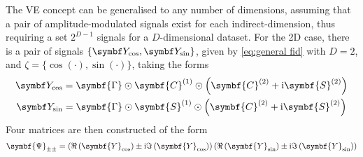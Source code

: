 The \ac{VE} concept can be generalised to any number of dimensions, assuming
that a pair of amplitude-modulated signals exist for each indirect-dimension,
thus requiring a set $2^{D-1}$ signals for a $D$-dimensional dataset. For the
\ac{2D} case, there is a pair of signals $\lbrace \bY_{\cos}, \bY_{\sin}
\rbrace$, given by \eqref{eq:general fid} with $D=2$, and $\zeta = \lbrace
\cos(\cdot), \sin(\cdot) \rbrace$, taking the forms
\begin{subequations}
    \begin{gather}
        \bY_{\cos} =
            \symbf{\Gamma} \odot
            \symbf{C}^{(1)} \odot \left(
                \symbf{C}^{(2)} +
                \iu \symbf{S}^{(2)}
            \right) \\
        \bY_{\sin} =
            \symbf{\Gamma} \odot
            \symbf{S}^{(1)} \odot \left(
                \symbf{C}^{(2)} +
                \iu \symbf{S}^{(2)}
            \right)
    \end{gather}
\end{subequations}
Four matrices are then constructed of the form
\begin{equation}
    \symbf{\Psi}_{\pm\pm} =
        \left(
            \Re\left( \symbf{Y}_{\cos} \right) \pm
            \iu \Im\left( \symbf{Y}_{\cos} \right)
        \right)
        \left(
            \Re\left( \symbf{Y}_{\sin} \right) \pm
            \iu \Im\left( \symbf{Y}_{\sin} \right)
        \right)
\end{equation}

